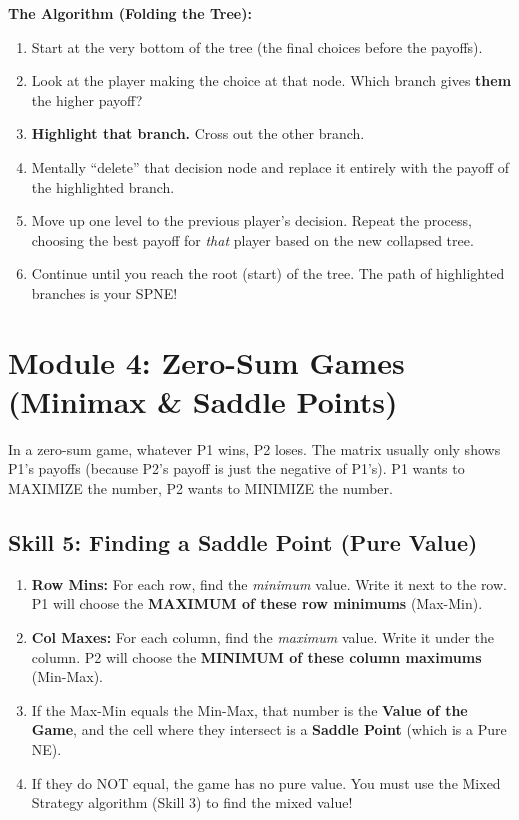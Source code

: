 \documentclass[12pt, a4paper]{article}
\begin{document}
\textbf{The Algorithm (Folding the Tree):}
\begin{enumerate}
    \item Start at the very bottom of the tree (the final choices before the payoffs).
    \item Look at the player making the choice at that node. Which branch gives \textbf{them} the higher payoff?
    \item \textbf{Highlight that branch.} Cross out the other branch.
    \item Mentally ``delete'' that decision node and replace it entirely with the payoff of the highlighted branch.
    \item Move up one level to the previous player's decision. Repeat the process, choosing the best payoff for \textit{that} player based on the new collapsed tree.
    \item Continue until you reach the root (start) of the tree. The path of highlighted branches is your SPNE!
\end{enumerate}

\section{Module 4: Zero-Sum Games (Minimax \& Saddle Points)}

In a zero-sum game, whatever P1 wins, P2 loses. The matrix usually only shows P1's payoffs (because P2's payoff is just the negative of P1's). P1 wants to MAXIMIZE the number, P2 wants to MINIMIZE the number.

\subsection{Skill 5: Finding a Saddle Point (Pure Value)}
\begin{enumerate}
    \item \textbf{Row Mins:} For each row, find the \textit{minimum} value. Write it next to the row. P1 will choose the \textbf{MAXIMUM of these row minimums} (Max-Min).
    \item \textbf{Col Maxes:} For each column, find the \textit{maximum} value. Write it under the column. P2 will choose the \textbf{MINIMUM of these column maximums} (Min-Max).
    \item If the Max-Min equals the Min-Max, that number is the \textbf{Value of the Game}, and the cell where they intersect is a \textbf{Saddle Point} (which is a Pure NE). 
    \item If they do NOT equal, the game has no pure value. You must use the Mixed Strategy algorithm (Skill 3) to find the mixed value!
\end{enumerate}
\end{document}
